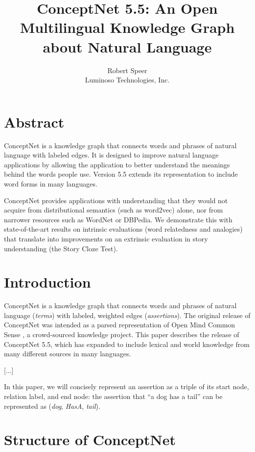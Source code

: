 \documentclass[letterpaper]{article}
\begin{document}
\title{ConceptNet 5.5: An Open Multilingual Knowledge Graph about Natural Language}
\author{Robert Speer\\ Luminoso Technologies, Inc.}

\maketitle


\section{Abstract}\label{abstract}

ConceptNet is a knowledge graph that connects words and phrases of
natural language with labeled edges. It is designed to improve natural
language applications by allowing the application to better understand
the meanings behind the words people use. Version 5.5 extends its
representation to include word forms in many languages.

ConceptNet provides applications with understanding that they would not acquire
from distributional semantics (such as word2vec) alone, nor from narrower
resources such as WordNet or DBPedia. We demonstrate this with state-of-the-art
results on intrinsic evaluations (word relatedness and analogies) that
translate into improvements on an extrinsic evaluation in story understanding
(the Story Cloze Test).


\section{Introduction}\label{introduction}

ConceptNet is a knowledge graph that connects words and phrases of
natural language (\emph{terms}) with labeled, weighted edges
(\emph{assertions}). The original release of ConceptNet \cite{liu2004conceptnet}
was intended as a parsed representation of Open Mind Common Sense
\cite{singh2002omcs}, a crowd-sourced knowledge project. This paper
describes the release of ConceptNet 5.5, which has expanded to include
lexical and world knowledge from many different sources in many
languages.

[...]

In this paper, we will concisely represent an assertion as a triple of
its start node, relation label, and end node: the assertion that ``a dog
has a tail'' can be represented as (\emph{dog}, \emph{HasA},
\emph{tail}).


\section{Structure of ConceptNet}\label{structure-of-conceptnet}
\end{document}
